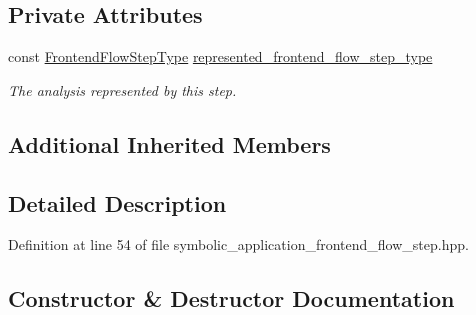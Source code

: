 \subsection*{Private Attributes}
\begin{DoxyCompactItemize}
\item 
const \hyperlink{frontend__flow__step_8hpp_afeb3716c693d2b2e4ed3e6d04c3b63bb}{Frontend\+Flow\+Step\+Type} \hyperlink{classSymbolicApplicationFrontendFlowStep_ae156dc307ce4e73c6afe75383460e557}{represented\+\_\+frontend\+\_\+flow\+\_\+step\+\_\+type}
\begin{DoxyCompactList}\small\item\em The analysis represented by this step. \end{DoxyCompactList}\end{DoxyCompactItemize}
\subsection*{Additional Inherited Members}


\subsection{Detailed Description}


Definition at line 54 of file symbolic\+\_\+application\+\_\+frontend\+\_\+flow\+\_\+step.\+hpp.



\subsection{Constructor \& Destructor Documentation}
\mbox{\label{classSymbolicApplicationFrontendFlowStep_a80ea7eea8b5aebb0c08e06a174a184fd}} 
